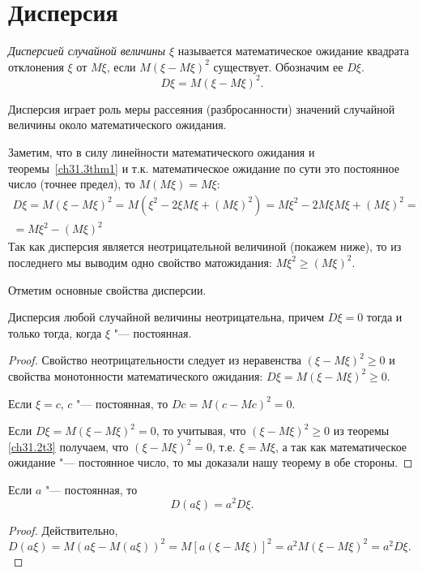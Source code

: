 \section{Дисперсия}
\begin{defn}
\textit{Дисперсией случайной величины $\xi$} называется математическое ожидание квадрата отклонения $\xi$ от $M\xi$, если $M(\xi-M\xi)^2$ существует. Обозначим ее $D\xi$. 
\begin{equation} \label{ch31.4eq1}
D\xi=M(\xi-M\xi)^2.
\end{equation}
\end{defn}

Дисперсия играет роль меры рассеяния (разбросанности) значений случайной величины около математического ожидания.

Заметим, что в силу линейности математического ожидания и теоремы~\ref{ch31.3thm1}\; и т.к. математическое ожидание по сути это постоянное число (точнее предел), то $M(M\xi)=M\xi$:
\begin{multline*}
D\xi = M(\xi-M\xi)^2=M(\xi^2-2\xi M\xi+(M\xi)^2)=M\xi^2-2M\xi M\xi+(M\xi)^2=\\=M\xi^2-(M\xi)^2
\end{multline*}
Так как дисперсия является неотрицательной величиной (покажем ниже), то из последнего мы выводим одно свойство матожидания: $M\xi^2\ge(M\xi)^2$.

Отметим основные свойства дисперсии.

\begin{thm} Дисперсия любой случайной величины неотрицательна, причем $D\xi = 0$ тогда и только тогда, когда $\xi$ "--- постоянная. 
\end{thm}
\begin{proof}
Свойство неотрицательности следует из неравенства $(\xi - M \xi)^2 \ge 0$ и свойства монотонности математического ожидания: $D \xi = M (\xi - M \xi)^2 \ge 0$.

Если $\xi = c$, $c$ "--- постоянная, то $D c = M (c - M c)^2 = 0$. 

Если $D\xi=M (\xi - M \xi)^2=0$, то учитывая, что $(\xi - M \xi)^2\ge 0$ из теоремы \ref{ch31.2t3} получаем, что $(\xi - M \xi)^2=0$, т.е. $\xi=M\xi$, а так как математическое ожидание "--- постоянное число, то мы доказали нашу теорему в обе стороны.
\end{proof}
\begin{thm} Если $a$ "--- постоянная, то $$D(a\xi) = a^2 D\xi.$$
\end{thm}
\begin{proof}
Действительно, $D(a\xi) = M(a\xi - M (a\xi))^2 = M [a (\xi - M \xi)]^2 = a^2M(\xi - M\xi)^2 = a^2 D\xi.$
\end{proof}

